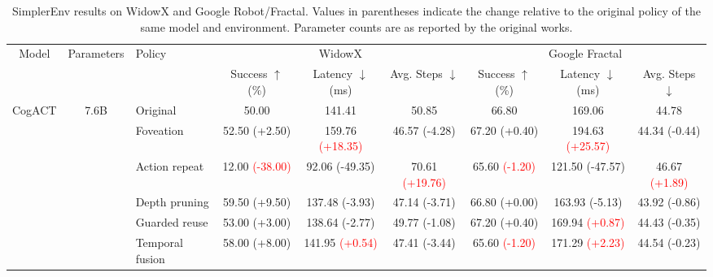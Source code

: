 \begin{table}[t]
\centering
\caption{SimplerEnv results on WidowX and Google Robot/Fractal. Values in parentheses indicate the change relative to the original policy of the same model and environment. Parameter counts are as reported by the original works.}
\label{tab:simplerenv-results}
\small
\setlength{\tabcolsep}{2.2pt}
\begin{tabular}{cclcccccc}
\toprule
\multirow{2}{*}{Model} & \multirow{2}{*}{Parameters} & \multirow{2}{*}{Policy}
& \multicolumn{3}{c}{WidowX}
& \multicolumn{3}{c}{Google Fractal} \\
\cmidrule(lr){4-6}
\cmidrule(lr){7-9}
& & & Success $\uparrow$ (\%) & Latency $\downarrow$ (ms) & Avg. Steps $\downarrow$
& Success $\uparrow$ (\%) & Latency $\downarrow$ (ms) & Avg. Steps $\downarrow$ \\
\midrule

\multirow[c]{6}{*}{CogACT}
& \multirow[c]{6}{*}{7.6B}
& Original & 50.00 & 141.41 & 50.85 & 66.80 & 169.06 & 44.78 \\
& & Foveation & 52.50 {\scriptsize\textcolor{green!50!black}{(+2.50)}} & 159.76 {\scriptsize\textcolor{red}{(+18.35)}} & 46.57 {\scriptsize\textcolor{green!50!black}{(-4.28)}} & 67.20 {\scriptsize\textcolor{green!50!black}{(+0.40)}} & 194.63 {\scriptsize\textcolor{red}{(+25.57)}} & 44.34 {\scriptsize\textcolor{green!50!black}{(-0.44)}} \\
& & Action repeat & 12.00 {\scriptsize\textcolor{red}{(-38.00)}} & 92.06 {\scriptsize\textcolor{green!50!black}{(-49.35)}} & 70.61 {\scriptsize\textcolor{red}{(+19.76)}} & 65.60 {\scriptsize\textcolor{red}{(-1.20)}} & 121.50 {\scriptsize\textcolor{green!50!black}{(-47.57)}} & 46.67 {\scriptsize\textcolor{red}{(+1.89)}} \\
& & Depth pruning & 59.50 {\scriptsize\textcolor{green!50!black}{(+9.50)}} & 137.48 {\scriptsize\textcolor{green!50!black}{(-3.93)}} & 47.14 {\scriptsize\textcolor{green!50!black}{(-3.71)}} & 66.80 {\scriptsize\textcolor{green!50!black}{(+0.00)}} & 163.93 {\scriptsize\textcolor{green!50!black}{(-5.13)}} & 43.92 {\scriptsize\textcolor{green!50!black}{(-0.86)}} \\
& & Guarded reuse & 53.00 {\scriptsize\textcolor{green!50!black}{(+3.00)}} & 138.64 {\scriptsize\textcolor{green!50!black}{(-2.77)}} & 49.77 {\scriptsize\textcolor{green!50!black}{(-1.08)}} & 67.20 {\scriptsize\textcolor{green!50!black}{(+0.40)}} & 169.94 {\scriptsize\textcolor{red}{(+0.87)}} & 44.43 {\scriptsize\textcolor{green!50!black}{(-0.35)}} \\
& & Temporal fusion & 58.00 {\scriptsize\textcolor{green!50!black}{(+8.00)}} & 141.95 {\scriptsize\textcolor{red}{(+0.54)}} & 47.41 {\scriptsize\textcolor{green!50!black}{(-3.44)}} & 65.60 {\scriptsize\textcolor{red}{(-1.20)}} & 171.29 {\scriptsize\textcolor{red}{(+2.23)}} & 44.54 {\scriptsize\textcolor{green!50!black}{(-0.23)}} \\
\cmidrule(lr){1-9}


\end{tabular}
\end{table}
